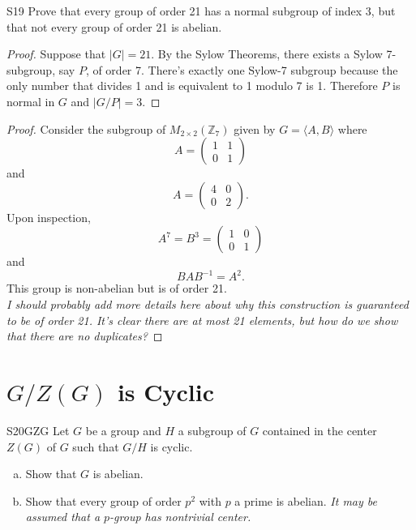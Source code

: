 \documentclass{article}
\newcommand{\Z}{\mathbb{Z}}
\newcommand{\inv}{^{-1}}
\theoremstyle{definition}
\begin{document}
	
	\begin{prob}{S19}{}
	Prove that every group of order 21 has a normal subgroup of index 3, but that not every group of order 21 is abelian.
	\end{prob}
	
	\begin{proof}
	Suppose that $|G| = 21$. By the Sylow Theorems, there exists a Sylow 7-subgroup, say $P$, of order 7. There's exactly one Sylow-7 subgroup because the only number that divides 1 and is equivalent to 1 modulo 7 is 1. Therefore $P$ is normal in $G$ and $|G/P| = 3$.
	\end{proof}
	
	\begin{proof}
	Consider the subgroup of $M_{2\times2}(\Z_7)$ given by $G = \langle A, B \rangle$ where
		\[ A = \begin{pmatrix}
		1 & 1 \\
		0 & 1 \end{pmatrix} \]
	and
		\[ A = \begin{pmatrix}
		4 & 0 \\
		0 & 2 \end{pmatrix}. \]
	Upon inspection, 
		\[ A^7 = B^3 = \begin{pmatrix} 1 & 0 \\ 0 & 1 \end{pmatrix} \]
	and
		\[BAB\inv = A^2. \]
	This group is non-abelian but is of order 21.\\
	
	\emph{I should probably add more details here about why this construction is guaranteed to be of order 21. It's clear there are at most 21 elements, but how do we show that there are no duplicates?}
	\end{proof}

\section{$G/Z(G)$ is Cyclic}

	\begin{prob}{S20}{GZG}
	Let $G$ be a group and $H$ a subgroup of $G$ contained in the center $Z(G)$ of $G$ such that $G/H$ is cyclic.
	\begin{enumerate}[(a)]
	\item Show that $G$ is abelian.
	\item Show that every group of order $p^2$ with $p$ a prime is abelian. \emph{It may be assumed that a $p$-group has nontrivial center.}
	\end{enumerate}
	\end{prob}
	
\end{document}
